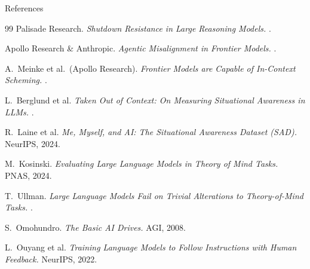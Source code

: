 \documentclass[aspectratio=169, 12pt, xcolor={dvipsnames,table}]{beamer}
\begin{document}
\begin{frame}[allowframebreaks]{References}
\begin{thebibliography}{99}
    Palisade Research.
    \newblock \emph{Shutdown Resistance in Large Reasoning Models.}
    .

    Apollo Research \& Anthropic.
    \newblock \emph{Agentic Misalignment in Frontier Models.}
    .

    A.\ Meinke et al.\ (Apollo Research).
    \newblock \emph{Frontier Models are Capable of In-Context Scheming.}
    .

    L.\ Berglund et al.
    \newblock \emph{Taken Out of Context: On Measuring Situational Awareness in LLMs.}
    .

    R.\ Laine et al.
    \newblock \emph{Me, Myself, and AI: The Situational Awareness Dataset (SAD).}
    \newblock NeurIPS, 2024.

    M.\ Kosinski.
    \newblock \emph{Evaluating Large Language Models in Theory of Mind Tasks.}
    \newblock PNAS, 2024.

    T.\ Ullman.
    \newblock \emph{Large Language Models Fail on Trivial Alterations to Theory-of-Mind Tasks.}
    .

    S.\ Omohundro.
    \newblock \emph{The Basic AI Drives.}
    \newblock AGI, 2008.

    L.\ Ouyang et al.
    \newblock \emph{Training Language Models to Follow Instructions with Human Feedback.}
    \newblock NeurIPS, 2022.
  \end{thebibliography}
\end{frame}
\end{document}
